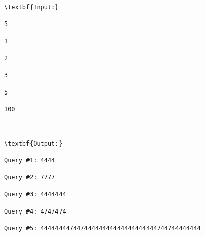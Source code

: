 \begin{verbatim}
\textbf{Input:}

5

1

2

3

5

100



\textbf{Output:}

Query #1: 4444

Query #2: 7777

Query #3: 4444444

Query #4: 4747474

Query #5: 44444444744744444444444444444444744744444444

\end{verbatim}